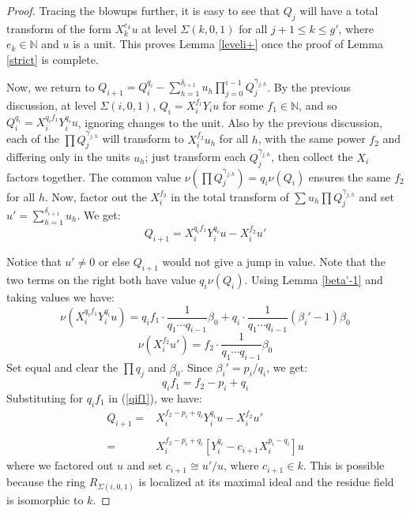 \documentclass[11pt]{amsart}
\theoremstyle{definition}
\begin{document}
{\begin{proof}
Tracing the blowups further, it is easy to see that $Q_j$ will have a total transform of the form $\displaystyle X_{k}^{e_k}u$ at level $\Sigma(k,0,1)$ for all $j+1\leq k \leq g'$, where $e_k\in\mathbb{N}$ and $u$ is a unit. This proves Lemma \ref{leveli+} once the proof of Lemma \ref{strict} is complete.

Now, we return to $\displaystyle Q_{i+1}=Q_i^{q_i}-\sum_{h=1}^{\delta_{i+1}} u_h \prod_{j=0}^{i-1}Q_j^{\gamma_{j,h}}$. By the previous discussion, at level $\Sigma(i,0,1)$, $Q_i=X_{i}^{f_1}Y_{i}u$ for some $f_1\in\mathbb{N}$, and so $Q_i^{q_i}=X_i^{q_if_1}Y_i^{q_i}u$, ignoring changes to the unit. Also by the previous discussion, each of the $\prod Q_j^{\gamma_{j,h}}$ will transform to $X_{i}^{f_2}u_h$ for all $h$, with the same power $f_2$ and differing only in the units $u_h$; just transform each $Q_j^{\gamma_{j,h}}$, then collect the $X_{i}$ factors together. The common value $\nu(\prod Q_j^{\gamma_{j,h}})=q_i\nu(Q_i)$ ensures the same $f_2$ for all $h$. Now, factor out the $X_{i}^{f_2}$ in the total transform of $\sum u_h \prod Q_j^{\gamma_{j,h}}$ and set $u'=\sum_{h=1}^{\delta_{i+1}} u_h$. We get:
\begin{equation} \label{qif1}
Q_{i+1}= X_{i}^{q_if_1}Y_{i}^{q_i}u - X_{i}^{f_2}u'
\end{equation}

Notice that $u'\neq 0$ or else $Q_{i+1}$ would not give a jump in value. Note that the two terms on the right both have value $q_i \nu(Q_i)$. Using Lemma \ref{beta'-1} and taking values we have:
\begin{equation*}
\nu\left(X_{i}^{q_if_1}Y_{i}^{q_i}u\right)=q_if_1 \cdot \frac{1}{q_1\cdots q_{i-1}}\beta_0 + q_i\cdot \frac{1}{q_1\cdots q_{i-1}}(\beta_i'-1)\beta_0
\end{equation*}
\begin{equation*}
\nu(X_i^{f_2}u')=f_2\cdot \frac{1}{q_1 \cdots q_{i-1}}\beta_0
\end{equation*}
Set equal and clear the $\prod q_j$ and $\beta_0$. Since $\beta_i'=p_i/q_i$, we get:
\begin{equation*}
q_i f_1=f_2-p_i+q_i
\end{equation*}
Substituting for $q_if_1$ in (\ref{qif1}), we have:
\begin{equation*}
\begin{array}{rl}
\displaystyle Q_{i+1}= & X_{i}^{f_2-p_i+q_i}Y_{i}^{q_i}u - X_{i}^{f_2}u'
\\\\
= & X_{i}^{f_2-p_i+q_i}\left[Y_{i}^{q_i} - c_{i+1}X_{i}^{p_i-q_i}\right]u
\end{array}
\end{equation*}
where we factored out $u$ and set $c_{i+1}\cong u'/u$, where $c_{i+1}\in k$. This is possible because the ring $R_{\Sigma(i,0,1)}$ is localized at its maximal ideal and the residue field is isomorphic to $k$.


\end{proof}}
\end{document}
